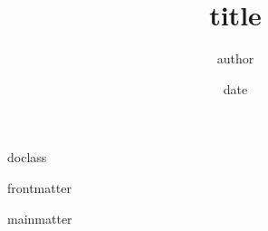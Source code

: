 {{ doclass }}

\usepackage[subsection]{omni-floats}

%

\title{ {{ title }} }
\author{ {{ author }} }
\date{ {{ date }} }



{{ frontmatter }}
\maketitle

\tableofcontents

{{ mainmatter }}
% 

\clearpage



